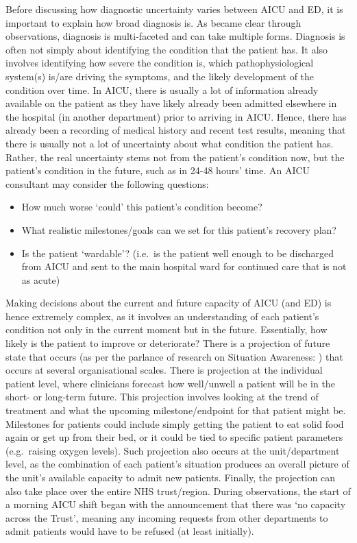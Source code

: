 \documentclass[a4paper, nobind]{templates/ociamthesis}
\providecommand{\tightlist}{%
  \setlength{\itemsep}{0pt}\setlength{\parskip}{0pt}}
\begin{document}
\hfill\break
Before discussing how diagnostic uncertainty varies between AICU and ED, it is important to explain how broad diagnosis is. As became clear through observations, diagnosis is multi-faceted and can take multiple forms. Diagnosis is often not simply about identifying the condition that the patient has. It also involves identifying how severe the condition is, which pathophysiological system(s) is/are driving the symptoms, and the likely development of the condition over time. In AICU, there is usually a lot of information already available on the patient as they have likely already been admitted elsewhere in the hospital (in another department) prior to arriving in AICU. Hence, there has already been a recording of medical history and recent test results, meaning that there is usually not a lot of uncertainty about what condition the patient has. Rather, the real uncertainty stems not from the patient's condition now, but the patient's condition in the future, such as in 24-48 hours' time. An AICU consultant may consider the following questions:\\

\begin{itemize}
\tightlist
\item
  How much worse `could' this patient's condition become?
\item
  What realistic milestones/goals can we set for this patient's recovery plan?
\item
  Is the patient `wardable'? (i.e.~is the patient well enough to be discharged from AICU and sent to the main hospital ward for continued care that is not as acute)
\end{itemize}

\hfill\break
Making decisions about the current and future capacity of AICU (and ED) is hence extremely complex, as it involves an understanding of each patient's condition not only in the current moment but in the future. Essentially, how likely is the patient to improve or deteriorate? There is a projection of future state that occurs (as per the parlance of research on Situation Awareness: \textcite{endsley_toward_1995}) that occurs at several organisational scales. There is projection at the individual patient level, where clinicians forecast how well/unwell a patient will be in the short- or long-term future. This projection involves looking at the trend of treatment and what the upcoming milestone/endpoint for that patient might be. Milestones for patients could include simply getting the patient to eat solid food again or get up from their bed, or it could be tied to specific patient parameters (e.g.~raising oxygen levels). Such projection also occurs at the unit/department level, as the combination of each patient's situation produces an overall picture of the unit's available capacity to admit new patients. Finally, the projection can also take place over the entire NHS trust/region. During observations, the start of a morning AICU shift began with the announcement that there was `no capacity across the Trust', meaning any incoming requests from other departments to admit patients would have to be refused (at least initially).
\end{document}
